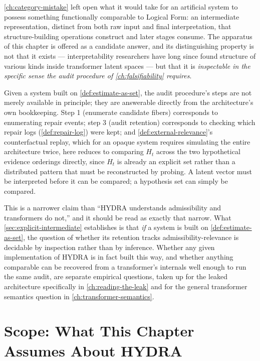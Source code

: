 \documentclass[11pt]{book}
\theoremstyle{plain}
\theoremstyle{definition}
\theoremstyle{remark}
\begin{document}
\cref{ch:category-mistake} left open what it would take for an
artificial system to possess something functionally comparable to
Logical Form: an intermediate representation, distinct from both raw
input and final interpretation, that structure-building operations
construct and later stages consume. The apparatus of this chapter is
offered as a candidate answer, and its distinguishing property is not
that it exists --- interpretability researchers have long since found
structure of various kinds inside transformer latent spaces --- but
that it is \emph{inspectable in the specific sense the audit procedure
of \cref{ch:falsifiability} requires}.

Given a system built on \cref{def:estimate-as-set}, the audit
procedure's steps are not merely available in principle; they are
answerable directly from the architecture's own bookkeeping. Step 1
(enumerate candidate fibers) corresponds to enumerating repair events;
step 3 (audit retention) corresponds to checking which repair logs
(\cref{def:repair-log}) were kept; and \cref{def:external-relevance}'s
counterfactual replay, which for an opaque system requires simulating
the entire architecture twice, here reduces to comparing $H_t$ across
the two hypothetical evidence orderings directly, since $H_t$ is
already an explicit set rather than a distributed pattern that must be
reconstructed by probing. A latent vector must be interpreted before
it can be compared; a hypothesis set can simply be compared.

This is a narrower claim than \enquote{HYDRA understands admissibility
and transformers do not,} and it should be read as exactly that
narrow. What \cref{sec:explicit-intermediate} establishes is that
\emph{if} a system is built on \cref{def:estimate-as-set}, the
question of whether its retention tracks admissibility-relevance is
decidable by inspection rather than by inference. Whether any given
implementation of HYDRA is in fact built this way, and whether
anything comparable can be recovered from a transformer's internals
well enough to run the same audit, are separate empirical questions,
taken up for the leaked architecture specifically in
\cref{ch:reading-the-leak} and for the general transformer semantics
question in \cref{ch:transformer-semantics}.

\section{Scope: What This Chapter Assumes About HYDRA}
\label{sec:hydra-scope}
\end{document}
